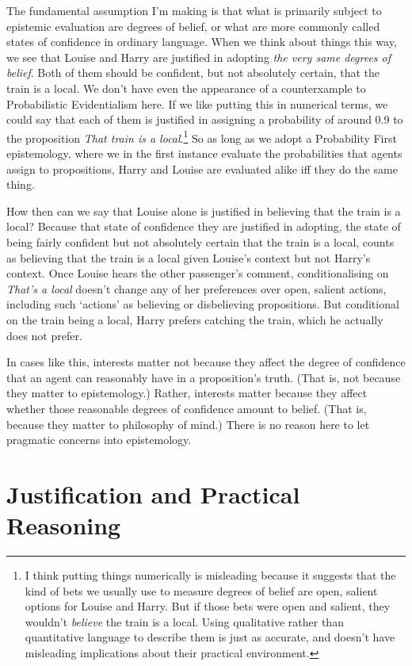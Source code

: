 \documentclass[
  11pt,
  letterpaper,
  DIV=11,
  numbers=noendperiod,
  twoside]{scrartcl}
\begin{document}
The fundamental assumption I'm making is that what is primarily subject
to epistemic evaluation are degrees of belief, or what are more commonly
called states of confidence in ordinary language. When we think about
things this way, we see that Louise and Harry are justified in adopting
\emph{the very same degrees of belief}. Both of them should be
confident, but not absolutely certain, that the train is a local. We
don't have even the appearance of a counterxample to Probabilistic
Evidentialism here. If we like putting this in numerical terms, we could
say that each of them is justified in assigning a probability of around
0.9 to the proposition \emph{That train is a local}.\footnote{I think
  putting things numerically is misleading because it suggests that the
  kind of bets we usually use to measure degrees of belief are open,
  salient options for Louise and Harry. But if those bets were open and
  salient, they wouldn't \emph{believe} the train is a local. Using
  qualitative rather than quantitative language to describe them is just
  as accurate, and doesn't have misleading implications about their
  practical environment.} So as long as we adopt a Probability First
epistemology, where we in the first instance evaluate the probabilities
that agents assign to propositions, Harry and Louise are evaluated alike
iff they do the same thing.

How then can we say that Louise alone is justified in believing that the
train is a local? Because that state of confidence they are justified in
adopting, the state of being fairly confident but not absolutely certain
that the train is a local, counts as believing that the train is a local
given Louise's context but not Harry's context. Once Louise hears the
other passenger's comment, conditionalising on \emph{That's a local}
doesn't change any of her preferences over open, salient actions,
including such `actions' as believing or disbelieving propositions. But
conditional on the train being a local, Harry prefers catching the
train, which he actually does not prefer.

In cases like this, interests matter not because they affect the degree
of confidence that an agent can reasonably have in a proposition's
truth. (That is, not because they matter to epistemology.) Rather,
interests matter because they affect whether those reasonable degrees of
confidence amount to belief. (That is, because they matter to philosophy
of mind.) There is no reason here to let pragmatic concerns into
epistemology.

\section{Justification and Practical
Reasoning}\label{justification-and-practical-reasoning}
\end{document}
